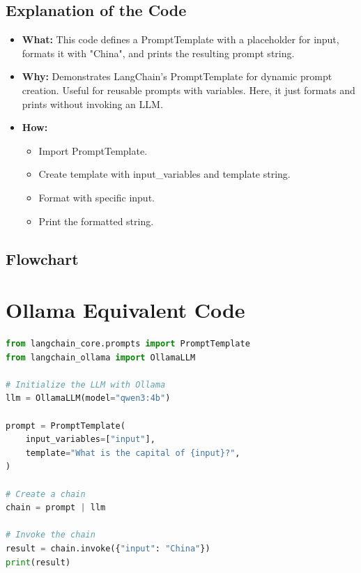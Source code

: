 \documentclass[11pt, a4paper]{article}
\begin{document}
\subsection{Explanation of the Code}
\begin{itemize}
    \item \textbf{What:} This code defines a PromptTemplate with a placeholder for input, formats it with "China", and prints the resulting prompt string.
    \item \textbf{Why:} Demonstrates LangChain's PromptTemplate for dynamic prompt creation. Useful for reusable prompts with variables. Here, it just formats and prints without invoking an LLM.
    \item \textbf{How:}
    \begin{itemize}
        \item Import PromptTemplate.
        \item Create template with input\_variables and template string.
        \item Format with specific input.
        \item Print the formatted string.
    \end{itemize}
\end{itemize}

\subsection{Flowchart}

\section{Ollama Equivalent Code}
\begin{lstlisting}[language=Python]
from langchain_core.prompts import PromptTemplate
from langchain_ollama import OllamaLLM

# Initialize the LLM with Ollama
llm = OllamaLLM(model="qwen3:4b")

prompt = PromptTemplate(
    input_variables=["input"],
    template="What is the capital of {input}?",
)

# Create a chain
chain = prompt | llm

# Invoke the chain
result = chain.invoke({"input": "China"})
print(result)
\end{lstlisting}
\end{document}
